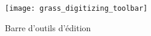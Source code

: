 \begin{figure}[h]
   \begin{center}
   \texttt{[image: grass\_digitizing\_toolbar]}
   \caption{Barre d'outils d'édition \grass \nixcaption}\label{fig:grass_digitizing_toolbar} 
\end{center}  
\end{figure}
{\renewcommand{\arraystretch}{2}
\begin{table}[p]
\centering
 \begin{tabular}{|m{1cm}|m{4cm}|m{8.5cm}|}

\end{tabular}
\end{table}}
